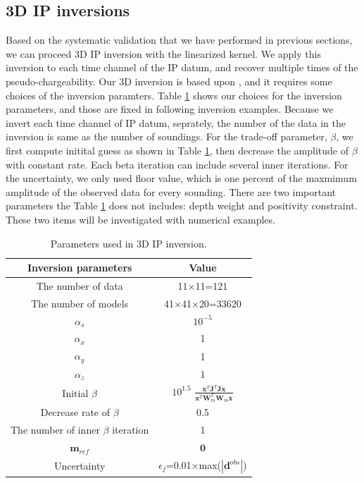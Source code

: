 \documentclass[a4paper, 11pt]{article}
\begin{document}
\subsection{3D IP inversions}
Based on the systematic validation that we have performed in previous sections, we can proceed 3D IP inversion with the linearized kernel.
We apply this inversion to each time channel of the IP datum, and recover multiple times of the pseudo-chargeability. 
Our 3D inversion is based upon \cite{doug1994,Li2000}, and it requires some choices of the inversion paramters. 
Table \ref{table:inversion_params} shows our choices for the inversion parameters, and those are fixed in following inversion examples. 
Because we invert each time channel of IP datum, seprately, the number of the data in the inversion is same as the number of soundings. 
For the trade-off parameter, $\beta$, we first compute initital guess as shown in Table \ref{table:inversion_params}, then decrease the amplitude of $\beta$ with constant rate. 
Each beta iteration can include several inner iterations. 
For the uncertainty, we only used floor value, which is one percent of the maxmimum amplitude of the observed data for every sounding. 
There are two important parameters the Table \ref{table:inversion_params} does not includes: depth weight and positivity constraint. 
These two items will be investigated with numerical examples. 

\begin{table}[ht]
  \caption{Parameters used in 3D IP inversion.} %
  \centering %
  \begin{tabular}{c c} %
  \hline\hline %
  Inversion parameters & Value \\
  [0.1ex] %
  \hline
  The number of data &    11$\times$11=121 \\
  The number of models &  41$\times$41$\times$20=33620 \\
  $\alpha_s$ &  $10^{-5}$\\
  $\alpha_x$ &  1\\
  $\alpha_y$ &  1\\
  $\alpha_z$ &  1\\
  Initial $\beta$ &  $10^{1.5}$ $\frac{\mathbf{x}^T\mathbf{J}^T\mathbf{J}\mathbf{x}}{\mathbf{x}^T\mathbf{W}_m^T\mathbf{W}_m\mathbf{x}}$\\
  Decrease rate of $\beta$ &  0.5\\
  The number of inner $\beta$ iteration & 1\\
  $\mathbf{m}_{ref}$ & $\mathbf{0}$ \\
  Uncertainty & $\epsilon_j$=0.01$\times$max($|\mathbf{d}^{obs}|$) \\
  \hline %
  \end{tabular}
  \label{table:inversion_params} %
\end{table}
\end{document}

